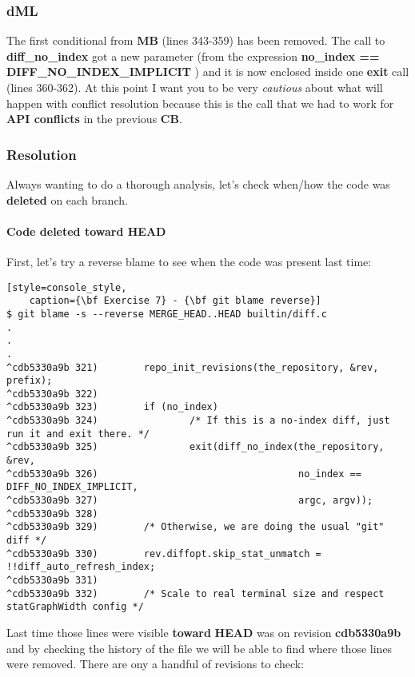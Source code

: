 \subsubsection*{dML}
The first conditional from {\bf MB} (lines 343-359) has been removed. The call to {\bf diff\_no\_index} got
a new parameter (from the expression {\bf no\_index == DIFF\_NO\_INDEX\_IMPLICIT }) and it is now enclosed inside one
{\bf exit} call (lines 360-362). At this point I want you to be very {\it cautious} about what will happen with conflict
resolution because this is the call that we had to work for {\bf API conflicts} in the previous {\bf CB}.


\subsubsection*{Resolution}

Always wanting to do a thorough analysis, let's check when/how the code was {\bf deleted} on each branch.

\paragraph{Code deleted toward HEAD}
First, let's try a reverse blame to see when the code was present last time:

\begin{lstlisting}[style=console_style,
	caption={\bf Exercise 7} - {\bf git blame reverse}]
$ git blame -s --reverse MERGE_HEAD..HEAD builtin/diff.c
.
.
.
^cdb5330a9b 321)        repo_init_revisions(the_repository, &rev, prefix);
^cdb5330a9b 322) 
^cdb5330a9b 323)        if (no_index)
^cdb5330a9b 324)                /* If this is a no-index diff, just run it and exit there. */
^cdb5330a9b 325)                exit(diff_no_index(the_repository, &rev,
^cdb5330a9b 326)                                   no_index == DIFF_NO_INDEX_IMPLICIT,
^cdb5330a9b 327)                                   argc, argv));
^cdb5330a9b 328) 
^cdb5330a9b 329)        /* Otherwise, we are doing the usual "git" diff */
^cdb5330a9b 330)        rev.diffopt.skip_stat_unmatch = !!diff_auto_refresh_index;
^cdb5330a9b 331) 
^cdb5330a9b 332)        /* Scale to real terminal size and respect statGraphWidth config */
\end{lstlisting}

Last time those lines were visible {\bf toward} {\bf HEAD} was on revision {\bf cdb5330a9b} and by checking the history
of the file we will be able to find where those lines were removed. There are ony a handful of revisions to check:

